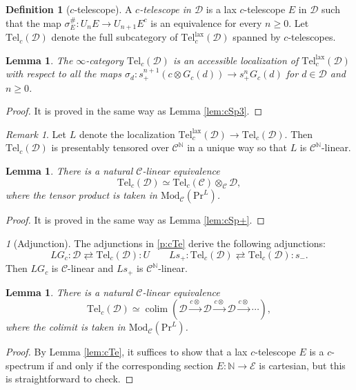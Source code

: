 \documentclass{amsart}
\theoremstyle{plain}
\newtheorem{lemma}[theorem]{Lemma}
\theoremstyle{definition}
\newtheorem{definition}[theorem]{Definition}
\theoremstyle{remark}
\newtheorem{remark}[theorem]{Remark}
\newtheorem{p}[theorem]{}
\numberwithin{equation}{theorem}
\newcommand{\mcal}[1]{\mathcal{#1}}
\newcommand{\mbb}[1]{\mathbb{#1}}
\newcommand{\Mod}{\mathrm{Mod}}
\renewcommand{\Pr}{\mathrm{Pr}}
\newcommand{\Tel}{\mathrm{Tel}}
\newcommand{\lax}{\mathrm{lax}}
\newcommand{\colim}{\operatorname*{colim}}
\begin{document}
\begin{definition}[$c$-telescope]\label{def:cTe2}
A \textit{$c$-telescope in $\mcal{D}$} is a lax $c$-telescope $E$ in $\mcal{D}$ such that the map $\sigma^\#_E\colon U_nE\to U_{n+1}E^c$ is an equivalence for every $n\ge 0$.
Let $\Tel_c(\mcal{D})$ denote the full subcategory of $\Tel^\lax_c(\mcal{D})$ spanned by $c$-telescopes.
\end{definition}

\begin{lemma}\label{lem:cTe2}
The $\infty$-category $\Tel_c(\mcal{D})$ is an accessible localization of $\Tel^\lax_c(\mcal{D})$ with respect to all the maps $\sigma_d\colon s_+^{n+1}(c\otimes G_c(d))\to s_+^nG_c(d)$ for $d\in\mcal{D}$ and $n\ge 0$.
\end{lemma}
\begin{proof}
It is proved in the same way as Lemma \ref{lem:cSp3}.
\end{proof}

\begin{remark}
Let $L$ denote the localization $\Tel^\lax_c(\mcal{D})\to\Tel_c(\mcal{D})$.
Then $\Tel_c(\mcal{D})$ is presentably tensored over $\mcal{C}^\mbb{N}$ in a unique way so that $L$ is $\mcal{C}^\mbb{N}$-linear.
\end{remark}

\begin{lemma}\label{lem:cTe+}
There is a natural $\mcal{C}$-linear equivalence
\[
	\Tel_c(\mcal{D}) \simeq \Tel_c(\mcal{C})\otimes_\mcal{C}\mcal{D},
\]
where the tensor product is taken in $\Mod_\mcal{C}(\Pr^L)$.
\end{lemma}
\begin{proof}
It is proved in the same way as Lemma \ref{lem:cSp+}.
\end{proof}

\begin{p}[Adjunction]\label{p:cTe2}
The adjunctions in \ref{p:cTe} derive the following adjunctions:
\[
	LG_c \colon \mcal{D} \rightleftarrows \Tel_c(\mcal{D}) \colon U \qquad
	Ls_+ \colon \Tel_c(\mcal{D}) \rightleftarrows \Tel_c(\mcal{D}) \colon s_-.
\]
Then $LG_c$ is $\mcal{C}$-linear and $Ls_+$ is $\mcal{C}^\mbb{N}$-linear.
\end{p}

\begin{lemma}\label{lem:cTe3}
There is a natural $\mcal{C}$-linear equivalence 
\[
	 \Tel_c(\mcal{D}) \simeq \colim(\mcal{D} \xrightarrow{c\otimes} \mcal{D} \xrightarrow{c\otimes} \mcal{D} \xrightarrow{c\otimes} \cdots),
\]
where the colimit is taken in $\Mod_\mcal{C}(\Pr^L)$.
\end{lemma}
\begin{proof}
By Lemma \ref{lem:cTe}, it suffices to show that a lax $c$-telescope $E$ is a $c$-spectrum if and only if the corresponding section $E\colon\mbb{N}\to\mcal{E}$ is cartesian, but this is straightforward to check.
\end{proof}
\end{document}
